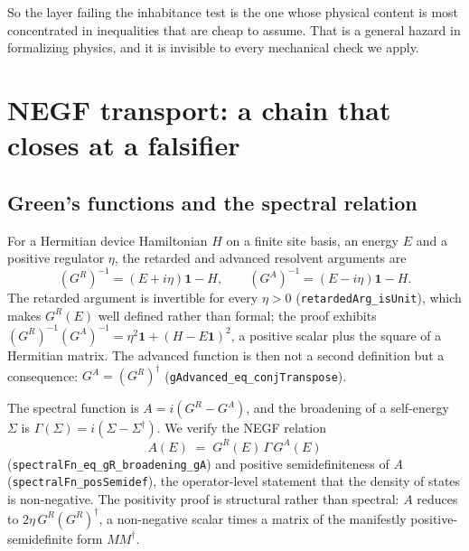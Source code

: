 \documentclass[aps,prd,reprint,nofootinbib,superscriptaddress]{revtex4-2}
\newcommand{\thm}[1]{\texttt{#1}}   %
\begin{document}
So the layer failing the inhabitance test is the one whose physical content is most concentrated in
inequalities that are cheap to assume. That is a general hazard in formalizing physics, and it is
invisible to every mechanical check we apply.

\section{NEGF transport: a chain that closes at a falsifier}
\label{sec:negf}

\subsection{Green's functions and the spectral relation}

For a Hermitian device Hamiltonian $H$ on a finite site basis, an energy $E$ and a positive regulator
$\eta$, the retarded and advanced resolvent arguments are
\begin{equation}
(G^{R})^{-1} = (E + i\eta)\mathbf{1} - H,
\qquad
(G^{A})^{-1} = (E - i\eta)\mathbf{1} - H .
\label{eq:negf-args}
\end{equation}
The retarded argument is invertible for every $\eta>0$ (\thm{retardedArg\_isUnit}), which makes
$G^{R}(E)$ well defined rather than formal; the proof exhibits
$(G^{R})^{-1}(G^{A})^{-1}=\eta^{2}\mathbf{1}+(H-E\mathbf{1})^{2}$, a positive scalar plus the square
of a Hermitian matrix. The advanced function is then not a second definition but a consequence:
$G^{A}=(G^{R})^{\dagger}$ (\thm{gAdvanced\_eq\_conjTranspose}).

The spectral function is $A=i(G^{R}-G^{A})$, and the broadening of a self-energy $\Sigma$ is
$\Gamma(\Sigma)=i(\Sigma-\Sigma^{\dagger})$. We verify the NEGF relation
\begin{equation}
A(E) \;=\; G^{R}(E)\,\Gamma\,G^{A}(E)
\label{eq:negf-spectral}
\end{equation}
(\thm{spectralFn\_eq\_gR\_broadening\_gA}) and positive semidefiniteness of $A$
(\thm{spectralFn\_posSemidef}), the operator-level statement that the density of states is
non-negative. The positivity proof is structural rather than spectral: $A$ reduces to
$2\eta\,G^{R}(G^{R})^{\dagger}$, a non-negative scalar times a matrix of the manifestly
positive-semidefinite form $MM^{\dagger}$.
\end{document}
